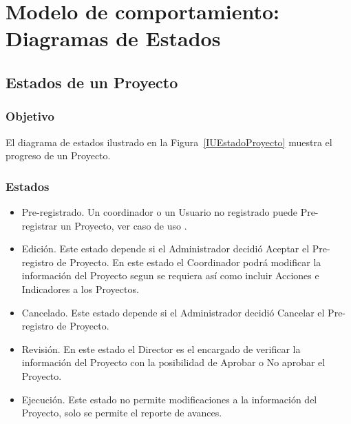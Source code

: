 \newpage
\section{Modelo de comportamiento: Diagramas de Estados}
\subsection{Estados de un Proyecto}
\subsubsection{Objetivo}
El diagrama de estados ilustrado en la Figura~\ref{IUEstadoProyecto} muestra el progreso de un Proyecto.


\subsubsection{Estados}
\begin{itemize}
 \item Pre-registrado. Un coordinador o un Usuario no registrado puede Pre-registrar un Proyecto, ver caso de uso .
 \item Edición. Este estado depende si el Administrador decidió Aceptar el Pre-registro de Proyecto. En este estado el Coordinador podrá modificar la información del Proyecto segun se requiera así como incluir Acciones e Indicadores a los Proyectos.
 \item Cancelado. Este estado depende si el Administrador decidió Cancelar el Pre-registro de Proyecto.
 \item Revisión. En este estado el Director es el encargado de verificar la información del Proyecto con la posibilidad de Aprobar o No aprobar el Proyecto.
 \item Ejecución. Este estado no permite modificaciones a la información del Proyecto, solo se permite el reporte de avances.
\end{itemize}